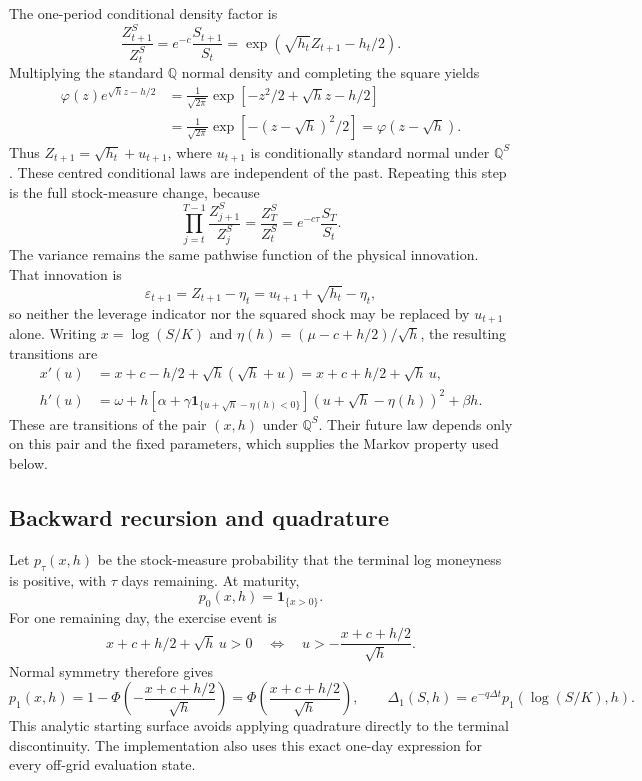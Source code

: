 \documentclass[11pt,a4paper]{article}
\newcommand{\Q}{\mathbb Q}
\newcommand{\ind}{\mathbf 1}
\newcommand{\dt}{\Delta t}
\theoremstyle{remark}
\begin{document}
The one-period conditional density factor is
\begin{equation}
 \frac{Z_{t+1}^S}{Z_t^S}
 =e^{-c}\frac{S_{t+1}}{S_t}
 =\exp(\sqrt{h_t}Z_{t+1}-h_t/2).
\end{equation}
Multiplying the standard $\Q$ normal density and completing the square yields
\begin{align}
 \varphi(z)e^{\sqrt h z-h/2}
 &=\frac1{\sqrt{2\pi}}\exp[-z^2/2+\sqrt h z-h/2]\nonumber\\
 &=\frac1{\sqrt{2\pi}}\exp[-(z-\sqrt h)^2/2]
 =\varphi(z-\sqrt h).
\end{align}
Thus $Z_{t+1}=\sqrt{h_t}+u_{t+1}$, where $u_{t+1}$ is conditionally standard normal under $\Q^S$. These centred conditional laws are independent of the past. Repeating this step is the full stock-measure change, because
\begin{equation}
 \prod_{j=t}^{T-1}\frac{Z_{j+1}^S}{Z_j^S}
 =\frac{Z_T^S}{Z_t^S}=e^{-c\tau}\frac{S_T}{S_t}.
\end{equation}
The variance remains the same pathwise function of the physical innovation. That innovation is
\begin{equation}
 \varepsilon_{t+1}=Z_{t+1}-\eta_t
                 =u_{t+1}+\sqrt{h_t}-\eta_t,
\end{equation}
so neither the leverage indicator nor the squared shock may be replaced by $u_{t+1}$ alone. Writing $x=\log(S/K)$ and $\eta(h)=(\mu-c+h/2)/\sqrt h$, the resulting transitions are
\begin{align}
 x'(u)&=x+c-h/2+\sqrt h(\sqrt h+u)
       =x+c+h/2+\sqrt h\,u,\nonumber\\
 h'(u)&=\omega+h[\alpha+\gamma\ind_{\{u+\sqrt h-\eta(h)<0\}}]
                    (u+\sqrt h-\eta(h))^2+\beta h.
 \label{eq:stocktransition}
\end{align}
These are transitions of the pair $(x,h)$ under $\Q^S$. Their future law depends only on this pair and the fixed parameters, which supplies the Markov property used below.

\subsection{Backward recursion and quadrature}
Let $p_\tau(x,h)$ be the stock-measure probability that the terminal log moneyness is positive, with $\tau$ days remaining. At maturity,
\begin{equation}
 p_0(x,h)=\ind_{\{x>0\}}.
\end{equation}
For one remaining day, the exercise event is
\begin{equation}
 x+c+h/2+\sqrt h\,u>0
 \quad\Longleftrightarrow\quad
 u>-\frac{x+c+h/2}{\sqrt h}.
\end{equation}
Normal symmetry therefore gives
\begin{equation}
 p_1(x,h)=1-\Phi\!\left(-\frac{x+c+h/2}{\sqrt h}\right)
          =\Phi\!\left(\frac{x+c+h/2}{\sqrt h}\right),\qquad
 \Delta_1(S,h)=e^{-q\dt}p_1(\log(S/K),h).
\end{equation}
This analytic starting surface avoids applying quadrature directly to the terminal discontinuity. The implementation also uses this exact one-day expression for every off-grid evaluation state.
\end{document}
